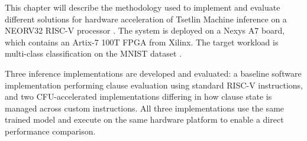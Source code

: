 \label{chap:method}
This chapter will describe the methodology used to implement and evaluate different solutions for hardware acceleration of Tsetlin Machine inference on a NEORV32 RISC-V processor \cite{Nolting2024NEORV32,Nolting2024UserGuide}. The system is deployed on a Nexys A7 board, which contains an Artix-7 100T FPGA from Xilinx. The target workload is multi-class classification on the MNIST dataset \cite{lecun_mnist}.

Three inference implementations are developed and evaluated: a baseline software 
implementation performing clause evaluation using standard RISC-V instructions, 
and two CFU-accelerated implementations differing in how clause state is managed 
across custom instructions. All three implementations use the same trained model 
and execute on the same hardware platform to enable a direct performance 
comparison.















